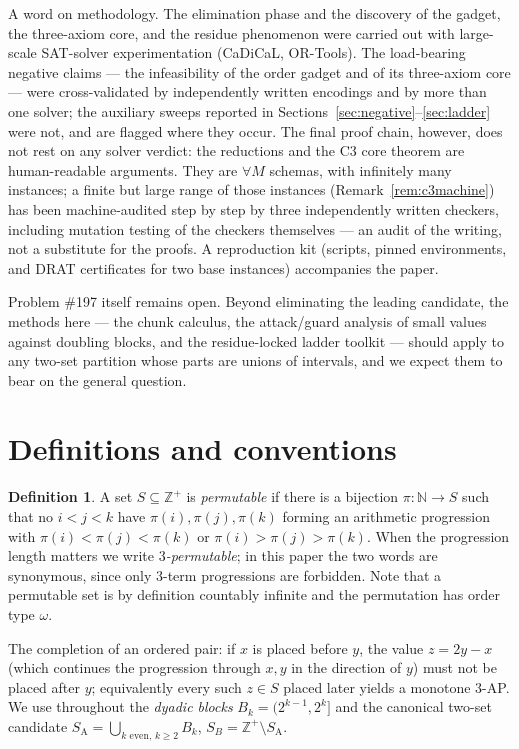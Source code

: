 \documentclass[11pt]{article}
\theoremstyle{definition}
\newtheorem{definition}[theorem]{Definition}
\newcommand{\Z}{\mathbb{Z}}
\newcommand{\N}{\mathbb{N}}
\newcommand{\SA}{S_{\mathrm{A}}}
\begin{document}
A word on methodology. The elimination phase and the discovery of the
gadget, the three-axiom core, and the residue phenomenon were carried out
with large-scale SAT-solver experimentation (CaDiCaL, OR-Tools). The
load-bearing negative claims --- the infeasibility of the order gadget and
of its three-axiom core --- were cross-validated by independently written
encodings and by more than one solver; the auxiliary sweeps reported in
Sections~\ref{sec:negative}--\ref{sec:ladder} were not, and are flagged
where they occur. The
final proof chain, however, does not rest on any solver verdict: the
reductions and the C3 core theorem are human-readable arguments. They are
$\forall M$ schemas, with infinitely many instances; a finite but large
range of those instances (Remark~\ref{rem:c3machine}) has been
machine-audited step by step by three
independently written checkers, including mutation testing of the checkers
themselves --- an audit of the writing, not a substitute for the proofs.
A reproduction kit (scripts, pinned environments, and
DRAT certificates for two base instances) accompanies the paper.

Problem \#197 itself remains open. Beyond eliminating the leading candidate,
the methods here --- the chunk calculus, the attack/guard analysis of small
values against doubling blocks, and the residue-locked ladder toolkit ---
should apply to any two-set partition whose parts are unions of intervals,
and we expect them to bear on the general question.

\section{Definitions and conventions}

\begin{definition}
A set $S \subseteq \Z^+$ is \emph{permutable} if there is a bijection
$\pi\colon \N \to S$ such that no $i<j<k$ have $\pi(i),\pi(j),\pi(k)$ forming an
arithmetic progression with $\pi(i)<\pi(j)<\pi(k)$ or $\pi(i)>\pi(j)>\pi(k)$.
When the progression length matters we write \emph{$3$-permutable}; in this
paper the two words are synonymous, since only $3$-term progressions are
forbidden. Note that a permutable set is by definition countably infinite
and the permutation has order type $\omega$.
\end{definition}

The completion of an ordered pair: if $x$ is placed before $y$, the value
$z = 2y - x$ (which continues the progression through $x,y$ in the direction of
$y$) must not be placed after $y$; equivalently every such $z \in S$ placed later
yields a monotone 3-AP. We use throughout the \emph{dyadic blocks}
$B_k = (2^{k-1}, 2^k]$ and the canonical two-set candidate
$\SA = \bigcup_{k \text{ even},\, k \ge 2} B_k$, $S_B = \Z^+ \setminus \SA$.
\end{document}
